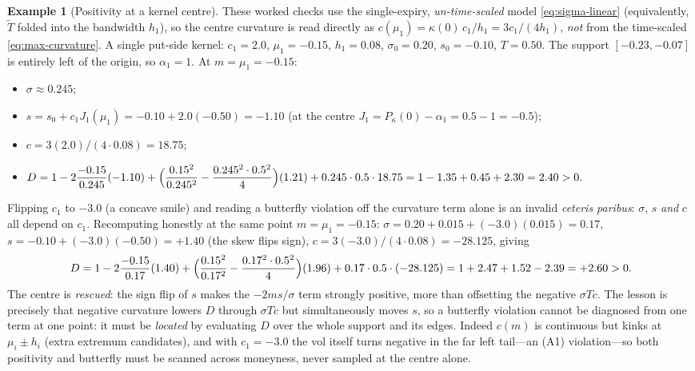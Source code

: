 \documentclass[11pt]{book}
\theoremstyle{plain}
\theoremstyle{definition}
\newtheorem{example}[theorem]{Example}
\theoremstyle{remark}
\newcommand{\mln}{m}                             %
\begin{document}
\begin{example}[Positivity at a kernel centre]\label{ex:positivity}
These worked checks use the single-expiry, \emph{un-time-scaled} model
\eqref{eq:sigma-linear} (equivalently, $\tilde T$ folded into the bandwidth
$h_1$), so the centre curvature is read directly as
$c(\mu_1)=\kappa(0)\,c_1/h_1 = 3c_1/(4h_1)$, \emph{not} from the time-scaled
\eqref{eq:max-curvature}. A single put-side kernel: $c_1 = 2.0$,
$\mu_1 = -0.15$, $h_1 = 0.08$, $\sigma_0 = 0.20$, $s_0 = -0.10$, $T = 0.50$. The
support $[-0.23,-0.07]$ is entirely left of the origin, so $\alpha_1 = 1$. At
$\mln = \mu_1 = -0.15$:
\begin{itemize}
\item $\sigma \approx 0.245$;
\item $s = s_0 + c_1 J_1(\mu_1) = -0.10 + 2.0(-0.50) = -1.10$
(at the centre $J_1 = P_\kappa(0) - \alpha_1 = 0.5 - 1 = -0.5$);
\item $c = 3(2.0)/(4\cdot 0.08) = 18.75$;
\item $D = 1 - 2\dfrac{-0.15}{0.245}(-1.10)
+ \Bigl(\dfrac{0.15^2}{0.245^2} - \dfrac{0.245^2\cdot 0.5^2}{4}\Bigr)(1.21)
+ 0.245\cdot 0.5\cdot 18.75
= 1 - 1.35 + 0.45 + 2.30 = 2.40 > 0.$
\end{itemize}
Flipping $c_1$ to $-3.0$ (a concave smile) and reading a butterfly
violation off the curvature term alone is an invalid \emph{ceteris
paribus}: $\sigma$, $s$ \emph{and} $c$ all depend on $c_1$. Recomputing
honestly at the same point $\mln=\mu_1=-0.15$:
$\sigma = 0.20 + 0.015 + (-3.0)(0.015) = 0.17$,
$s = -0.10 + (-3.0)(-0.50) = +1.40$ (the skew flips sign),
$c = 3(-3.0)/(4\cdot0.08) = -28.125$, giving
\[
D = 1 - 2\dfrac{-0.15}{0.17}(1.40)
+ \Bigl(\dfrac{0.15^2}{0.17^2} - \dfrac{0.17^2\cdot 0.5^2}{4}\Bigr)(1.96)
+ 0.17\cdot 0.5\cdot(-28.125)
= 1 + 2.47 + 1.52 - 2.39 = +2.60 > 0.
\]
The centre is \emph{rescued}: the sign flip of $s$ makes the $-2\mln s/\sigma$
term strongly positive, more than offsetting the negative $\sigma T c$. The
lesson is precisely that negative curvature lowers $D$ through $\sigma T c$ but
simultaneously moves $s$, so a butterfly violation cannot be diagnosed from one
term at one point: it must be \emph{located} by evaluating $D$ over the whole
support and its edges. Indeed $c(\mln)$ is continuous but kinks at
$\mu_i\pm h_i$ (extra extremum candidates), and with $c_1=-3.0$ the vol itself
turns negative in the far left tail---an (A1) violation---so both positivity and
butterfly must be scanned across moneyness, never sampled at the centre alone.
\end{example}
\end{document}
